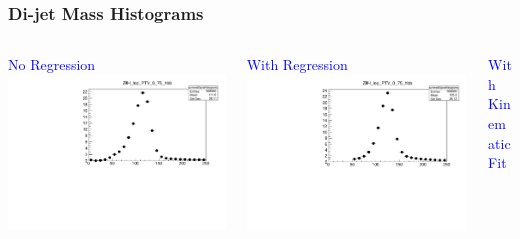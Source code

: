 \documentclass{beamer}
\begin{document}
\begin{frame}
  \frametitle{Di-jet Mass Histograms}

  \begin{columns}
    \begin{column}{0.33\linewidth}
      \centering
      \textcolor{blue}{No Regression}
      \includegraphics[width=\linewidth]{figs/noreg.pdf}
    \end{column}
    \begin{column}{0.34\linewidth}
      \centering
      \textcolor{blue}{With Regression}
      \includegraphics[width=\linewidth]{figs/reg.pdf}
    \end{column}
    \begin{column}{0.33\linewidth}
      \centering
      \textcolor{blue}{With Kinematic Fit}

\end{column}
\end{columns}
\end{frame}
\end{document}
